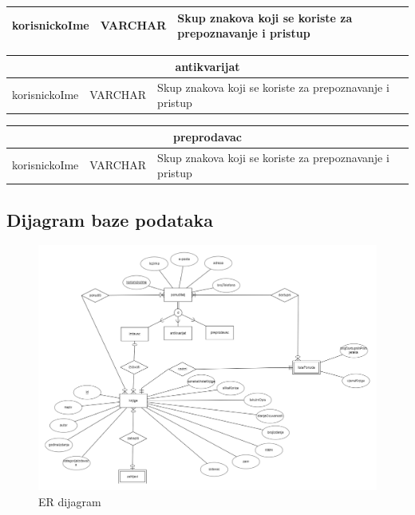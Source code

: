 \begin{center}
\begin{tabular}{ |p{4cm}|p{3cm}|p{5cm}|  }
					\bottomrule[2pt]
					\cellcolor{blue!10}korisnickoIme & VARCHAR & Skup znakova koji se koriste za prepoznavanje i pristup\\
					\hline
				\end{tabular}
				\vspace{1cm}
				\begin{tabular}{ |p{4cm}|p{3cm}|p{5cm}|  }
					\hline
					\multicolumn{3}{|c|}{\textbf{antikvarijat}} \\
					\bottomrule[2pt]
					\cellcolor{blue!10}korisnickoIme & VARCHAR & Skup znakova koji se koriste za prepoznavanje i pristup\\
					\hline
				\end{tabular}
				\vspace{1cm}
				\begin{tabular}{ |p{4cm}|p{3cm}|p{5cm}|  }
					\hline
					\multicolumn{3}{|c|}{\textbf{preprodavac}} \\
					\bottomrule[2pt]
					\cellcolor{blue!10}korisnickoIme & VARCHAR & Skup znakova koji se koriste za prepoznavanje i pristup\\
					\hline
				\end{tabular}
			\end{center}	
			
				
			
			\subsection{Dijagram baze podataka}
			
				\begin{figure}[H]
					\includegraphics[scale=0.35]{slike/4.1.2 er_dijagram.PNG} %
					\centering
					\caption{ER dijagram}
					\label{fig:ER dijagram}
				\end{figure}
			
